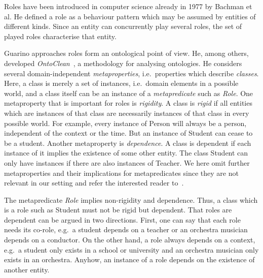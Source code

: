 Roles have been introduced in computer science already in 1977 by Bachman et al. He defined a role
as a behaviour pattern which may be assumed by entities of different kinds. Since an entity can
concurrently play several roles, the set of played roles characterise that entity.

Guarino approaches roles form an ontological point of view. He, among others, developed
\emph{OntoClean}~\cite{GuW-HoO09}, a methodology for analysing ontologies. He considers several
domain-independent \emph{metaproperties}, i.e.\ properties which describe \emph{classes}. Here, a
class is merely a set of instances, i.e.\ domain elements in a possible world, and a class itself
can be an instance of a \emph{metapredicate} such as \emph{Role}.
%
One metaproperty that is important for roles is \emph{rigidity}. A class is \emph{rigid} if all
entities which are instances of that class are necessarily instances of that class in every possible
world. For example, every instance of Person will always be a person, independent of the context or
the time. But an instance of Student can cease to be a student.
%
Another metaproperty is \emph{dependence}.  A class is dependent if each instance of it implies the
existence of some other entity. The class Student can only have instances if there are also
instances of Teacher.
%
We here omit further metaproperties and their implications for metapredicates since they are not
relevant in our setting and refer the interested reader
to~\cite{GuW-EKAW00,GuW00,GuW-CM00,WeG-DKE01}.

The metapredicate \emph{Role} implies non-rigidity and dependence. Thus, a class which is a
role such as Student must not be rigid but dependent. That roles are dependent can be argued in two
directions. First, one can say that each role needs its co-role, e.g.\ a student depends on a teacher
or an orchestra musician depends on a conductor. On the other hand, a role always depends on a
context, e.g.\ a student only exists in a school or university and an orchestra musician only exists
in an orchestra.  Anyhow, an instance of a role depends on the existence of another entity.

